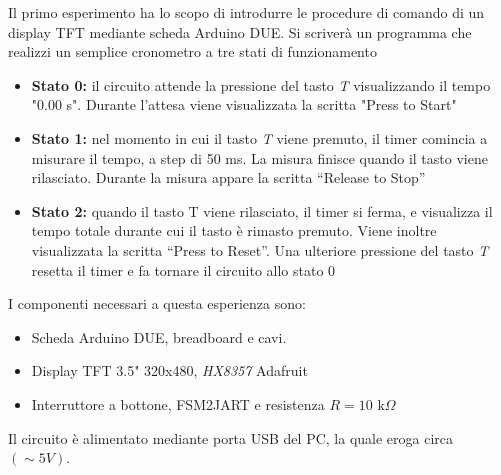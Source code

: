 Il primo esperimento ha lo scopo di introdurre le procedure di comando di un display TFT mediante scheda Arduino DUE. Si scriverà un programma che realizzi un semplice cronometro a tre stati di funzionamento
\begin{itemize}
    \item \textbf{Stato 0:} il circuito attende la pressione del tasto \textit{T} visualizzando il tempo "0.00 s". Durante l'attesa viene visualizzata la scritta "Press to Start"
    \item \textbf{Stato 1:} nel momento in cui il tasto \textit{T} viene premuto, il timer comincia a misurare il tempo, a step di 50 ms. La misura finisce quando il tasto viene rilasciato. Durante la misura appare la scritta “Release to Stop”
    \item \textbf{Stato 2:} quando il tasto T viene rilasciato, il timer si ferma, e visualizza il tempo totale durante cui il tasto è rimasto premuto. Viene inoltre visualizzata la scritta “Press to Reset”. Una ulteriore pressione del tasto \textit{T} resetta il timer e fa tornare il circuito allo stato 0
\end{itemize}
I componenti necessari a questa esperienza sono:
\begin{itemize}
    \item Scheda Arduino DUE, breadboard e cavi.
    \item Display TFT 3.5" 320x480, \textit{HX8357} Adafruit
    \item Interruttore a bottone, FSM2JART e resistenza $R=10\text{ k}\Omega$
\end{itemize}
Il circuito è alimentato mediante porta USB del PC, la quale eroga circa $(\sim 5 V)$.
